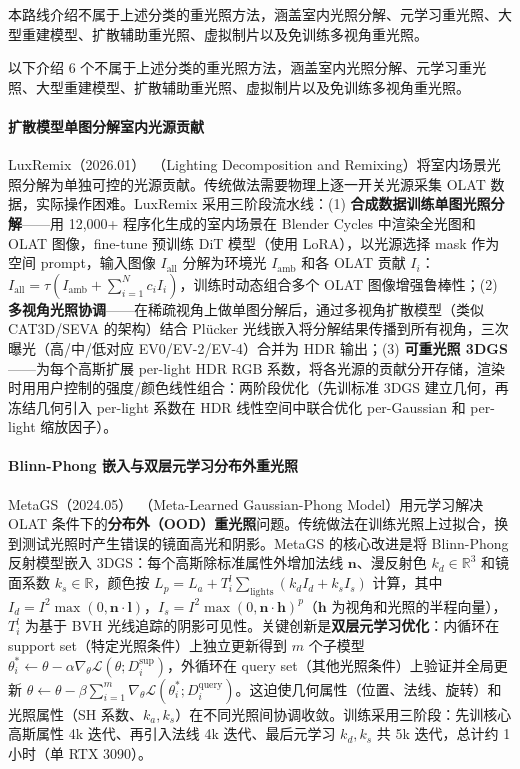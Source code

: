 本路线介绍不属于上述分类的重光照方法，涵盖室内光照分解、元学习重光照、大型重建模型、扩散辅助重光照、虚拟制片以及免训练多视角重光照。

以下介绍 6 个不属于上述分类的重光照方法，涵盖室内光照分解、元学习重光照、大型重建模型、扩散辅助重光照、虚拟制片以及免训练多视角重光照。

\paragraph{扩散模型单图分解室内光源贡献}

LuxRemix（2026.01）~\cite{2601_15283}（Lighting Decomposition and Remixing）将室内场景光照分解为单独可控的光源贡献。传统做法需要物理上逐一开关光源采集 OLAT 数据，实际操作困难。LuxRemix 采用三阶段流水线：(1) \textbf{合成数据训练单图光照分解}——用 12,000+ 程序化生成的室内场景在 Blender Cycles 中渲染全光图和 OLAT 图像，fine-tune 预训练 DiT 模型（使用 LoRA），以光源选择 mask 作为空间 prompt，输入图像 $I_\text{all}$ 分解为环境光 $I_{\text{amb}}$ 和各 OLAT 贡献 $I_i$：$I_\text{all} = \tau(I_{\text{amb}} + \sum_{i=1}^{N} c_i I_i)$，训练时动态组合多个 OLAT 图像增强鲁棒性；(2) \textbf{多视角光照协调}——在稀疏视角上做单图分解后，通过多视角扩散模型（类似 CAT3D/SEVA 的架构）结合 Plücker 光线嵌入将分解结果传播到所有视角，三次曝光（高/中/低对应 EV0/EV-2/EV-4）合并为 HDR 输出；(3) \textbf{可重光照 3DGS}——为每个高斯扩展 per-light HDR RGB 系数，将各光源的贡献分开存储，渲染时用用户控制的强度/颜色线性组合：两阶段优化（先训标准 3DGS 建立几何，再冻结几何引入 per-light 系数在 HDR 线性空间中联合优化 per-Gaussian 和 per-light 缩放因子）。

\paragraph{Blinn-Phong 嵌入与双层元学习分布外重光照}

MetaGS（2024.05）~\cite{2405_20791}（Meta-Learned Gaussian-Phong Model）用元学习解决 OLAT 条件下的\textbf{分布外（OOD）重光照}问题。传统做法在训练光照上过拟合，换到测试光照时产生错误的镜面高光和阴影。MetaGS 的核心改进是将 Blinn-Phong 反射模型嵌入 3DGS：每个高斯除标准属性外增加法线 $\mathbf{n}$、漫反射色 $k_d \in \mathbb{R}^3$ 和镜面系数 $k_s \in \mathbb{R}$，颜色按 $L_p = L_a + T_i^l \sum_{\text{lights}} (k_d I_d + k_s I_s)$ 计算，其中 $I_d = I^2 \max(0, \mathbf{n} \cdot \mathbf{l})$，$I_s = I^2 \max(0, \mathbf{n} \cdot \mathbf{h})^p$（$\mathbf{h}$ 为视角和光照的半程向量），$T_i^l$ 为基于 BVH 光线追踪的阴影可见性。关键创新是\textbf{双层元学习优化}：内循环在 support set（特定光照条件）上独立更新得到 $m$ 个子模型 $\theta_i^* \leftarrow \theta - \alpha \nabla_\theta \mathcal{L}(\theta; D_i^{\text{sup}})$，外循环在 query set（其他光照条件）上验证并全局更新 $\theta \leftarrow \theta - \beta \sum_{i=1}^{m} \nabla_\theta \mathcal{L}(\theta_i^*; D_i^{\text{query}})$。这迫使几何属性（位置、法线、旋转）和光照属性（SH 系数、$k_a, k_s$）在不同光照间协调收敛。训练采用三阶段：先训核心高斯属性 4k 迭代、再引入法线 4k 迭代、最后元学习 $k_d, k_s$ 共 5k 迭代，总计约 1 小时（单 RTX 3090）。

